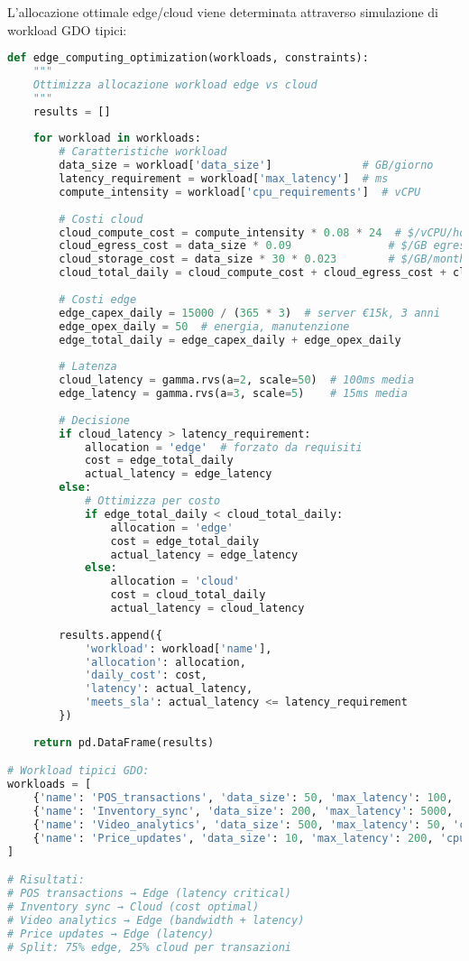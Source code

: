 L'allocazione ottimale edge/cloud viene determinata attraverso simulazione di workload GDO tipici:

\begin{lstlisting}[language=Python, caption=Ottimizzazione allocazione edge/cloud]
def edge_computing_optimization(workloads, constraints):
    """
    Ottimizza allocazione workload edge vs cloud
    """
    results = []
    
    for workload in workloads:
        # Caratteristiche workload
        data_size = workload['data_size']              # GB/giorno
        latency_requirement = workload['max_latency']  # ms
        compute_intensity = workload['cpu_requirements']  # vCPU
        
        # Costi cloud
        cloud_compute_cost = compute_intensity * 0.08 * 24  # $/vCPU/hour
        cloud_egress_cost = data_size * 0.09               # $/GB egress
        cloud_storage_cost = data_size * 30 * 0.023        # $/GB/month
        cloud_total_daily = cloud_compute_cost + cloud_egress_cost + cloud_storage_cost/30
        
        # Costi edge
        edge_capex_daily = 15000 / (365 * 3)  # server €15k, 3 anni
        edge_opex_daily = 50  # energia, manutenzione
        edge_total_daily = edge_capex_daily + edge_opex_daily
        
        # Latenza
        cloud_latency = gamma.rvs(a=2, scale=50)  # 100ms media
        edge_latency = gamma.rvs(a=3, scale=5)    # 15ms media
        
        # Decisione
        if cloud_latency > latency_requirement:
            allocation = 'edge'  # forzato da requisiti
            cost = edge_total_daily
            actual_latency = edge_latency
        else:
            # Ottimizza per costo
            if edge_total_daily < cloud_total_daily:
                allocation = 'edge'
                cost = edge_total_daily
                actual_latency = edge_latency
            else:
                allocation = 'cloud'
                cost = cloud_total_daily
                actual_latency = cloud_latency
                
        results.append({
            'workload': workload['name'],
            'allocation': allocation,
            'daily_cost': cost,
            'latency': actual_latency,
            'meets_sla': actual_latency <= latency_requirement
        })
        
    return pd.DataFrame(results)

# Workload tipici GDO:
workloads = [
    {'name': 'POS_transactions', 'data_size': 50, 'max_latency': 100, 'cpu_requirements': 10},
    {'name': 'Inventory_sync', 'data_size': 200, 'max_latency': 5000, 'cpu_requirements': 20},
    {'name': 'Video_analytics', 'data_size': 500, 'max_latency': 50, 'cpu_requirements': 50},
    {'name': 'Price_updates', 'data_size': 10, 'max_latency': 200, 'cpu_requirements': 5}
]

# Risultati:
# POS transactions → Edge (latency critical)
# Inventory sync → Cloud (cost optimal)
# Video analytics → Edge (bandwidth + latency)
# Price updates → Edge (latency)
# Split: 75% edge, 25% cloud per transazioni
\end{lstlisting}

